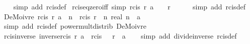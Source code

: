 \begin{isabellebody}
%
\isadelimproof
\ \ %
\endisadelimproof
%
\isatagproof
{}\isamarkupfalse%
\ {\isacharparenleft}{\kern0pt}simp\ add{\isacharcolon}{\kern0pt}\ rcis{\isacharunderscore}{\kern0pt}def{\isacharparenright}{\kern0pt}%
\endisatagproof
{\isafoldproof}%
%
\isadelimproof
\isanewline
%
\endisadelimproof
\isanewline
{}\isamarkupfalse%
\ rcis{\isacharunderscore}{\kern0pt}eq{\isacharunderscore}{\kern0pt}zero{\isacharunderscore}{\kern0pt}iff\ {\isacharbrackleft}{\kern0pt}simp{\isacharbrackright}{\kern0pt}{\isacharcolon}{\kern0pt}\ {\isachardoublequoteopen}rcis\ r\ a\ {\isacharequal}{\kern0pt}\ {}\ {\isasymlongleftrightarrow}\ r\ {\isacharequal}{\kern0pt}\ {}{\isachardoublequoteclose}\isanewline
%
\isadelimproof
\ \ %
\endisadelimproof
%
\isatagproof
{}\isamarkupfalse%
\ {\isacharparenleft}{\kern0pt}simp\ add{\isacharcolon}{\kern0pt}\ rcis{\isacharunderscore}{\kern0pt}def{\isacharparenright}{\kern0pt}%
\endisatagproof
{\isafoldproof}%
%
\isadelimproof
\isanewline
%
\endisadelimproof
\isanewline
{}\isamarkupfalse%
\ DeMoivre{}{\isacharcolon}{\kern0pt}\ {\isachardoublequoteopen}{\isacharparenleft}{\kern0pt}rcis\ r\ a{\isacharparenright}{\kern0pt}\ {\isacharcircum}{\kern0pt}\ n\ {\isacharequal}{\kern0pt}\ rcis\ {\isacharparenleft}{\kern0pt}r\ {\isacharcircum}{\kern0pt}\ n{\isacharparenright}{\kern0pt}\ {\isacharparenleft}{\kern0pt}real\ n\ {\isacharasterisk}{\kern0pt}\ a{\isacharparenright}{\kern0pt}{\isachardoublequoteclose}\isanewline
%
\isadelimproof
\ \ %
\endisadelimproof
%
\isatagproof
{}\isamarkupfalse%
\ {\isacharparenleft}{\kern0pt}simp\ add{\isacharcolon}{\kern0pt}\ rcis{\isacharunderscore}{\kern0pt}def\ power{\isacharunderscore}{\kern0pt}mult{\isacharunderscore}{\kern0pt}distrib\ DeMoivre{\isacharparenright}{\kern0pt}%
\endisatagproof
{\isafoldproof}%
%
\isadelimproof
\isanewline
%
\endisadelimproof
\isanewline
{}\isamarkupfalse%
\ rcis{\isacharunderscore}{\kern0pt}inverse{\isacharcolon}{\kern0pt}\ {\isachardoublequoteopen}inverse{\isacharparenleft}{\kern0pt}rcis\ r\ a{\isacharparenright}{\kern0pt}\ {\isacharequal}{\kern0pt}\ rcis\ {\isacharparenleft}{\kern0pt}{}\ {\isacharslash}{\kern0pt}\ r{\isacharparenright}{\kern0pt}\ {\isacharparenleft}{\kern0pt}{\isacharminus}{\kern0pt}\ a{\isacharparenright}{\kern0pt}{\isachardoublequoteclose}\isanewline
%
\isadelimproof
\ \ %
\endisadelimproof
%
\isatagproof
{}\isamarkupfalse%
\ {\isacharparenleft}{\kern0pt}simp\ add{\isacharcolon}{\kern0pt}\ divide{\isacharunderscore}{\kern0pt}inverse\ rcis{\isacharunderscore}{\kern0pt}def{\isacharparenright}{\kern0pt}%

\end{isabellebody}
